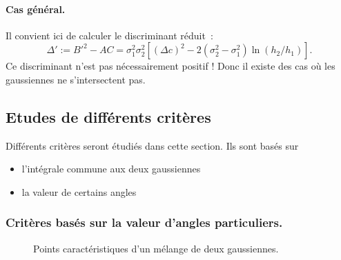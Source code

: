 \documentclass[main.tex]{subfiles}
\begin{document}
\paragraph{Cas général.} Il convient ici de calculer le discriminant réduit~:
\begin{equation}
\label{eq:discr_reduit}
\Delta' := B'^2 - AC = \sigma_1^2 \sigma_2^2 \left[ (\Delta c)^2 - 2(\sigma_2^2-\sigma_1^2) \ln (h_2/h_1)  \right].
\end{equation}
Ce discriminant n'est pas nécessairement positif ! Donc il existe des cas où les gaussiennes ne s'intersectent pas.

\subsection{Etudes de différents critères}
Différents critères seront étudiés dans cette section. Ils sont basés sur
\begin{itemize}
\item l'intégrale commune aux deux gaussiennes
\item la valeur de certains angles
\end{itemize}

\subsubsection{Critères basés sur la valeur d'angles particuliers.}
\begin{figure}
\qquad
{}
\caption{\label{fig:pts_carac_intersection_gaussienne}Points caractéristiques d'un mélange de deux gaussiennes.}
\end{figure}
\end{document}
